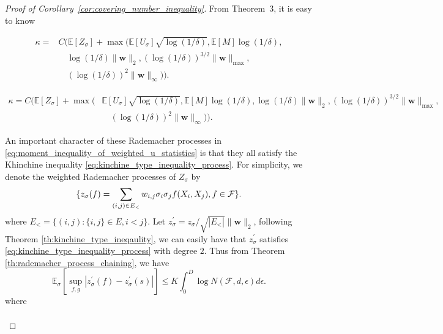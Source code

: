 \documentclass[letterpaper]{article} %
\def\DoubleColumn{}
\def\DoubleColumnEnd{}
\def\SingleColumn{}
\def\SingleColumnEnd{}
\newcommand{\E}{\mathbb{E}}
\newcommand{\weight}{\mathbf{w}}
\newcommand{\rademacher}{\sigma}
\newcommand{\pair}[1]{(#1)}
\begin{document}
\begin{proof}[Proof of Corollary~\ref{cor:covering_number_inequality}] %
    From Theorem~$3$, it is easy to know
    \DoubleColumn
    \begin{equation}
        \begin{aligned}
            \label{eq:moment_inequality_of_weighted_u_statistics}
            \kappa=&C(\E[Z_\rademacher]+\max(\E[U_\rademacher]\sqrt{\log(1/\delta)},\E[M]\log(1/\delta),\\
            &\quad\log(1/\delta)\|\weight{}\|_2,(\log(1/\delta))^{3/2}\|\weight{}\|_{\max},\\
            &\quad (\log(1/\delta))^2\|\weight{}\|_\infty)).
        \end{aligned}
    \end{equation}
    \DoubleColumnEnd
    \SingleColumn
    \begin{equation}
        \begin{aligned}
            \label{eq:moment_inequality_of_weighted_u_statistics}
            \kappa=C(\E[Z_\rademacher]+\max(&\E[U_\rademacher]\sqrt{\log(1/\delta)},\E[M]\log(1/\delta),\log(1/\delta)\|\weight{}\|_2,(\log(1/\delta))^{3/2}\|\weight{}\|_{\max},\\
            &\quad (\log(1/\delta))^2\|\weight{}\|_\infty)).
        \end{aligned}
    \end{equation}
    \SingleColumnEnd
An important character of these Rademacher processes in \eqref{eq:moment_inequality_of_weighted_u_statistics} is that they all satisfy the Khinchine inequality \eqref{eq:kinchine_type_inequality_process}. For simplicity, we denote the weighted Rademacher processes of $Z_\rademacher$ by 
\[\{z_\rademacher(f)=\sum_{\pair{i,j}\in E_<}w_{i,j}\rademacher_i\rademacher_j\linebreak f(X_i,X_j), f\in\mathcal{F}\}.\]
where $E_<=\{(i,j): \{i,j\}\in E, i<j\}$. Let $z_\rademacher^\prime=z_\rademacher/\sqrt{|E_<|}\|\weight{}\|_2$, following Theorem \ref{th:kinchine_type_ineqaulity}, we can easily have that $z_\rademacher^\prime$ satisfies \eqref{eq:kinchine_type_inequality_process} with degree $2$. Thus from Theorem \ref{th:rademacher_process_chaining}, we have
\begin{equation}
    \label{eq:weighted_rademacher_process_prove_1}
    \E_\rademacher[\sup_{f,g}|z^\prime_\rademacher(f)-z^\prime_\rademacher(s)|]\le K\int_0^D\log N(\mathcal F,d,\epsilon)d\epsilon.
\end{equation}
where 
\DoubleColumn
\begin{align*}

\end{align*}
\end{proof}
\end{document}

